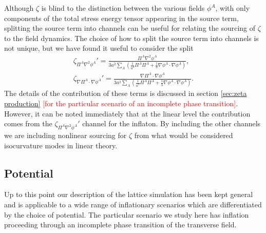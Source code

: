Although $\zeta$ is blind to the distinction between the various fields $\phi^A$, with only components of the total stress energy tensor appearing in the source term, splitting the source term into channels can be useful for relating the sourcing of $\zeta$ to the field dynamics. The choice of how to split the source term into channels is not unique, but we have found it useful to consider the split
\begin{align}
  \zeta_{\Pi^A\nabla^2\phi^A}' = \frac{\Pi^A\nabla^2\phi^A}{3a^2\sum_A\left(\frac{1}{a^4}\Pi^A\Pi^A + \frac{1}{3}\nabla\phi^A\cdot\nabla\phi^A \right)}, \\
  \zeta_{\nabla\Pi^A\cdot\nabla\phi^A}' = \frac{\nabla\Pi^A\cdot\nabla\phi^A}{3a^2\sum_A\left(\frac{1}{a^4}\Pi^A\Pi^A + \frac{1}{3}\nabla\phi^A\cdot\nabla\phi^A \right)}.
\end{align}
The details of the contribution of these terms is discussed in section \ref{sec:zeta production} \textcolor{red}{[for the particular scenario of an incomplete phase transition]}.
However, it can be noted immediately that at the linear level the contribution comes from the $\zeta_{\Pi^A\nabla^2\phi^A}'$ channel for the inflaton. By including the other channels we are including nonlinear sourcing for $\zeta$ from what would be considered isocurvature modes in linear theory.



\subsection{Potential} \label{sec:potential}
Up to this point our description of the lattice simulation has been kept general and is applicable to a wide range of inflationary scenarios which are differentiated by the choice of potential. The particular scenario we study here has inflation proceeding through an incomplete phase transition of the transverse field. 

